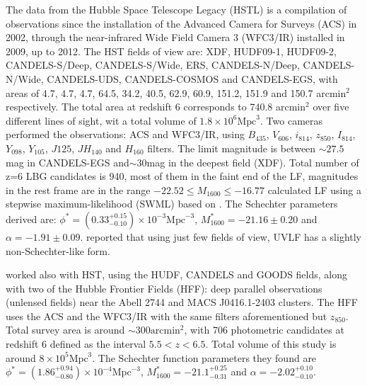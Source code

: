 \documentclass{emulateapj}
\begin{document}
The data from the Hubble Space Telescope Legacy (HSTL) \citep{bouwens14} is a compilation 
of observations since the installation of the Advanced Camera for Surveys (ACS) in 2002, 
through the near-infrared Wide Field Camera 3 (WFC3/IR) installed in 2009, up to 2012. 
The HST fields of view are: XDF, HUDF09-1, HUDF09-2, CANDELS-S/Deep, 
CANDELS-S/Wide, ERS, CANDELS-N/Deep, CANDELS-N/Wide, CANDELS-UDS, 
CANDELS-COSMOS and CANDELS-EGS, with areas of 4.7, 4.7, 4.7, 64.5, 34.2, 
40.5, 62.9, 60.9, 151.2, 151.9 and 150.7 arcmin$^2$ respectively. The total area 
at redshift 6 corresponds 
to 740.8 arcmin$^2$ over five different lines of sight, wit a total volume of 
$1.8 \times 10^6 \textrm{Mpc}^3$.
Two cameras performed the observations: ACS and WFC3/IR, using 
$B_{435}$, $V_{606}$, $ i_{814}$, $ z_{850}$, $ I_{814}$, $Y_{098}$, $Y_{105}$, $J{125}$, 
$JH_{140}$ and $H_{160}$ filters.
The limit magnitude is between $\sim27.5$mag in CANDELS-EGS and$\sim30 $mag in the 
deepest field (XDF). Total number of z=6 LBG candidates is 940, most of them in the faint 
end of the LF, magnitudes in the rest frame are in the range $-22.52\leq M_{1600} \leq -16.77$
\citet{bouwens14} calculated LF using a stepwise maximum-likelihood (SWML) based on \citet{efstathiou88}. 
The Schechter parameters derived are: 
$\phi^* =(0.33_{-0.10}^{+0.15}) \times 10 ^{-3}  \textrm{Mpc}^{-3} $, 
$M^*_{1600} = -21.16\pm 0.20$ and $\alpha = -1.91 \pm 0.09$. 
\citet{bouwens14} reported that using just few fields of view, UVLF has a slightly non-Schechter-like form. 

\citet{finkelstein14} worked also with HST, using the HUDF, CANDELS and GOODS fields, 
along with two of the Hubble Frontier Fields (HFF): deep parallel observations (unlensed 
fields) near the Abell 2744 and MACS J0416.1-2403 clusters. The HFF uses the ACS and 
the WFC3/IR with the same filters aforementioned but $z_{850}$. Total survey area is around 
$\sim300\textrm{arcmin}^2$, with 706 photometric candidates at redshift 6 defined as the interval $5.5<z<6.5$. 
Total volume of this study is around $ 8 \times 10^5 \textrm{Mpc}^3$. The Schechter function parameters they found are $\phi^* =(1.86_{-0.80}^{+0.94}) \times 10 ^{-4}  \textrm{Mpc}^{-3} $, 
$M^*_{1600} = -21.1_{-0.31}^{+0.25}$ and $\alpha = -2.02_{-0.10}^{+0.10}$. 
\end{document}

